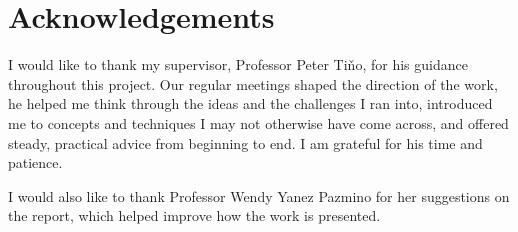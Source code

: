 
\chapter*{Acknowledgements}

I would like to thank my supervisor, Professor Peter Ti\v{n}o, for his guidance throughout this project. Our regular meetings shaped the direction of the work, he helped me think through the ideas and the challenges I ran into, introduced me to concepts and techniques I may not otherwise have come across, and offered steady, practical advice from beginning to end. I am grateful for his time and patience.

I would also like to thank Professor Wendy Yanez Pazmino for her suggestions on the report, which helped improve how the work is presented.